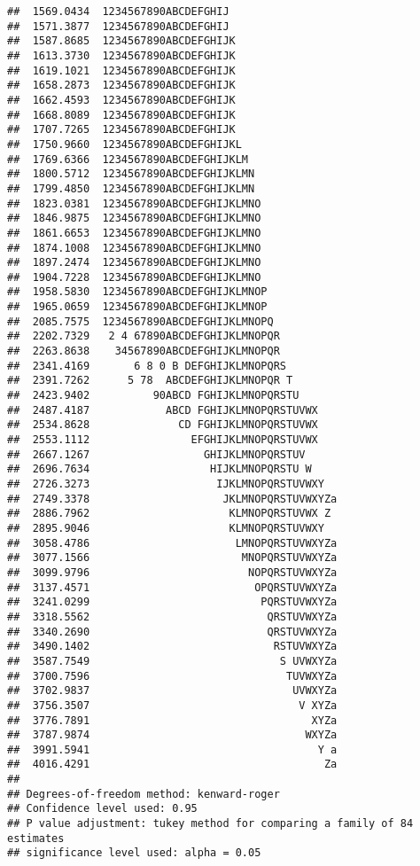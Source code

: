 \documentclass[]{book}
\theoremstyle{definition}
\theoremstyle{definition}
\theoremstyle{definition}
\theoremstyle{remark}
\begin{document}
\begin{verbatim}
##  1569.0434  1234567890ABCDEFGHIJ                 
##  1571.3877  1234567890ABCDEFGHIJ                 
##  1587.8685  1234567890ABCDEFGHIJK                
##  1613.3730  1234567890ABCDEFGHIJK                
##  1619.1021  1234567890ABCDEFGHIJK                
##  1658.2873  1234567890ABCDEFGHIJK                
##  1662.4593  1234567890ABCDEFGHIJK                
##  1668.8089  1234567890ABCDEFGHIJK                
##  1707.7265  1234567890ABCDEFGHIJK                
##  1750.9660  1234567890ABCDEFGHIJKL               
##  1769.6366  1234567890ABCDEFGHIJKLM              
##  1800.5712  1234567890ABCDEFGHIJKLMN             
##  1799.4850  1234567890ABCDEFGHIJKLMN             
##  1823.0381  1234567890ABCDEFGHIJKLMNO            
##  1846.9875  1234567890ABCDEFGHIJKLMNO            
##  1861.6653  1234567890ABCDEFGHIJKLMNO            
##  1874.1008  1234567890ABCDEFGHIJKLMNO            
##  1897.2474  1234567890ABCDEFGHIJKLMNO            
##  1904.7228  1234567890ABCDEFGHIJKLMNO            
##  1958.5830  1234567890ABCDEFGHIJKLMNOP           
##  1965.0659  1234567890ABCDEFGHIJKLMNOP           
##  2085.7575  1234567890ABCDEFGHIJKLMNOPQ          
##  2202.7329   2 4 67890ABCDEFGHIJKLMNOPQR         
##  2263.8638    34567890ABCDEFGHIJKLMNOPQR         
##  2341.4169       6 8 0 B DEFGHIJKLMNOPQRS        
##  2391.7262      5 78  ABCDEFGHIJKLMNOPQR T       
##  2423.9402          90ABCD FGHIJKLMNOPQRSTU      
##  2487.4187            ABCD FGHIJKLMNOPQRSTUVWX   
##  2534.8628              CD FGHIJKLMNOPQRSTUVWX   
##  2553.1112                EFGHIJKLMNOPQRSTUVWX   
##  2667.1267                  GHIJKLMNOPQRSTUV     
##  2696.7634                   HIJKLMNOPQRSTU W    
##  2726.3273                    IJKLMNOPQRSTUVWXY  
##  2749.3378                     JKLMNOPQRSTUVWXYZa
##  2886.7962                      KLMNOPQRSTUVWX Z 
##  2895.9046                      KLMNOPQRSTUVWXY  
##  3058.4786                       LMNOPQRSTUVWXYZa
##  3077.1566                        MNOPQRSTUVWXYZa
##  3099.9796                         NOPQRSTUVWXYZa
##  3137.4571                          OPQRSTUVWXYZa
##  3241.0299                           PQRSTUVWXYZa
##  3318.5562                            QRSTUVWXYZa
##  3340.2690                            QRSTUVWXYZa
##  3490.1402                             RSTUVWXYZa
##  3587.7549                              S UVWXYZa
##  3700.7596                               TUVWXYZa
##  3702.9837                                UVWXYZa
##  3756.3507                                 V XYZa
##  3776.7891                                   XYZa
##  3787.9874                                  WXYZa
##  3991.5941                                    Y a
##  4016.4291                                     Za
## 
## Degrees-of-freedom method: kenward-roger 
## Confidence level used: 0.95 
## P value adjustment: tukey method for comparing a family of 84 estimates 
## significance level used: alpha = 0.05
\end{verbatim}
\end{document}
